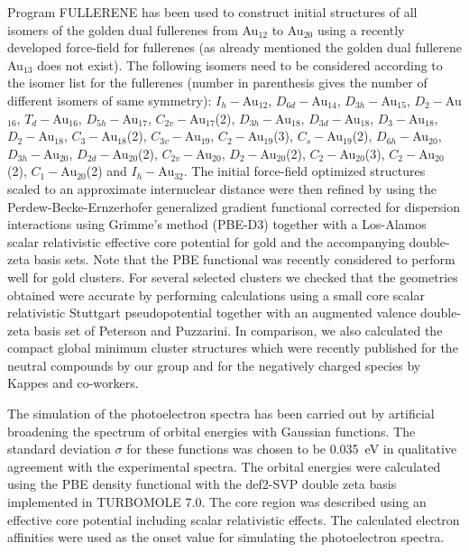 Program FULLERENE\autocite{Schwerdtfeger_Programfullerenesoftware_2013} has been used to construct initial
structures of all isomers of the golden dual fullerenes from Au$_{12}$ to
Au$_{20}$ using a recently developed force-field for
fullerenes\autocite{Wirz_smallfullerenesgraphene_2015} (as already mentioned the golden dual fullerene
Au$_{13}$ does not exist). The following isomers need to be considered
according to the isomer list for the fullerenes (number in parenthesis gives
the number of different isomers of same symmetry):\autocite{Brinkmann_HouseGraphsdatabase_2013,Schwerdtfeger_Programfullerenesoftware_2013}
$I_h-$Au$_{12}$, $D_{6d}-$Au$_{14}$, $D_{3h}-$Au$_{15}$, $D_{2}-$Au$_{16}$,
$T_{d}-$Au$_{16}$, $D_{5h}-$Au$_{17}$, $C_{2v}-$Au$_{17}$(2),
$D_{3h}-$Au$_{18}$, $D_{3d}-$Au$_{18}$, $D_{3}-$Au$_{18}$, $D_{2}-$Au$_{18}$,
$C_{3}-$Au$_{18}$(2), $C_{3v}-$Au$_{19}$, $C_{2}-$Au$_{19}$(3),
$C_{s}-$Au$_{19}$(2), $D_{6h}-$Au$_{20}$, $D_{3h}-$Au$_{20}$,
$D_{2d}-$Au$_{20}$(2), $C_{2v}-$Au$_{20}$, $D_{2}-$Au$_{20}$(2),
$C_{2}-$Au$_{20}$(3), $C_{2}-$Au$_{20}$(2), $C_{1}-$Au$_{20}$(2) and
$I_h-$Au$_{32}$. The initial force-field optimized structures scaled to an
approximate internuclear distance were then refined by using the
Perdew-Becke-Ernzerhofer generalized gradient
functional\autocite{Perdew_GeneralizedGradientApproximation_1996,PerdewGeneralizedGradientApproximation1997} corrected for dispersion interactions
using Grimme's method (PBE-D3)\autocite{Grimme_consistentaccurateinitio_2010,Grimme_Effectdampingfunction_2011} together with a Los-Alamos
scalar relativistic effective core potential for gold and the accompanying
double-zeta basis sets.\autocite{Wadt1985} Note that the PBE functional was recently
considered to perform well for gold clusters.\autocite{Mancera_alternativemethodologyassess_2015} For several
selected clusters we checked that the geometries obtained were accurate by
performing calculations using a small core scalar relativistic Stuttgart
pseudopotential\autocite{Figgen_Energyconsistentpseudopotentialsgroup_2005} together with an augmented valence double-zeta
basis set of Peterson and Puzzarini.\autocite{Peterson-2005} In comparison, we also
calculated the compact global minimum cluster structures which were recently
published for the neutral compounds by our group\autocite{Assadollahzadeh_systematicsearchminimum_2009} and
for the negatively charged species by Kappes and
co-workers.\autocite{Schooss_Determiningsizedependentstructure_2010,Lechtken_Structuredeterminationgold_2009}

The simulation of the photoelectron spectra has been carried out by artificial
broadening the spectrum of orbital energies with Gaussian functions. The standard deviation $\sigma$
for these functions was chosen to be 0.035~eV in qualitative agreement with the experimental spectra. The orbital energies were
calculated using the PBE density functional with the def2-SVP\autocite{Weigend_Balancedbasissets_2005} double zeta basis
implemented in TURBOMOLE 7.0.\autocite{_TURBOMOLEV72015_} The core region was described using an effective
core potential including scalar relativistic effects.
The calculated electron affinities were used as the onset value for simulating the photoelectron spectra. 


